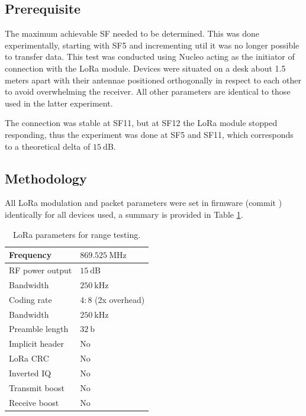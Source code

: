 \subsection{\label{section:range-prerequisite}Prerequisite}
The maximum achievable SF needed to be determined. This was done experimentally, starting with SF5 and incrementing util it was no longer possible to transfer data. This test was conducted using Nucleo acting as the initiator of connection with the LoRa module. Devices were situated on a desk about 1.5 meters apart with their antennae positioned orthogonally in respect to each other to avoid overwhelming the receiver. All other parameters are identical to those used in the latter experiment.

The connection was stable at SF11, but at SF12 the LoRa module stopped responding, thus the experiment was done at SF5 and SF11, which corresponds to a theoretical delta of $15~\mathrm{dB}$.

\subsection{Methodology}
All LoRa modulation and packet parameters were set in firmware (commit ) identically for all devices used, a summary is provided in Table \ref{table:range-test-parameters}. 

\begin{table}[H]
\begin{center}
\caption{\label{table:range-test-parameters}LoRa parameters for range testing.}
    \begin{tabular}{|l|l|} \hline
    Frequency             & $869.525~\mathrm{MHz}$\\ \hline
    RF power output       & $15~\mathrm{dB}$\\ \hline
    Bandwidth             & $250~\mathrm{kHz}$\\ \hline
    Coding rate           & $4:8$ (2x overhead) \\ \hline
    Bandwidth             & $250~\mathrm{kHz}$\\ \hline
    Preamble length       & $32~\mathrm{b}$\\ \hline
    Implicit header       & No\\ \hline
    LoRa CRC              & No\\ \hline
    Inverted IQ           & No\\ \hline
    Transmit boost        & No\\ \hline
    Receive boost         & No\\ \hline
    \end{tabular}
\end{center}
\end{table}

